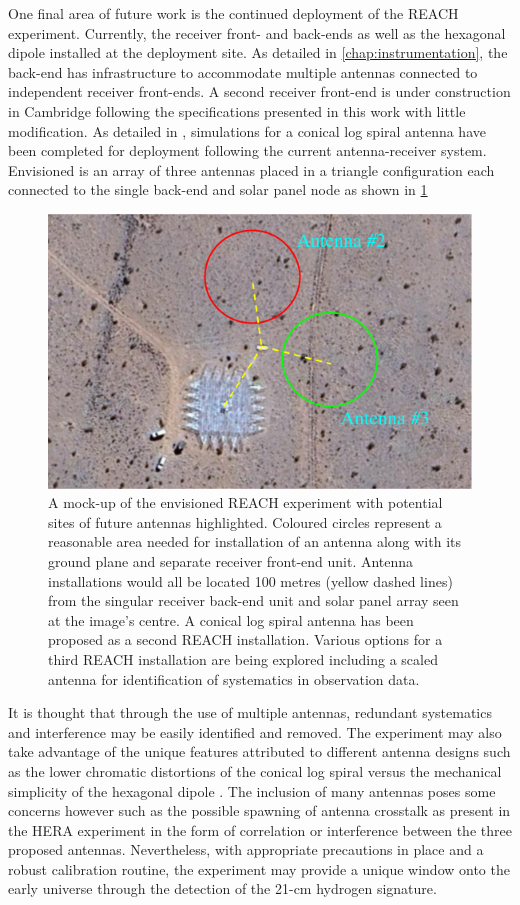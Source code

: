 One final area of future work is the continued deployment of the REACH experiment. Currently, the receiver front- and back-ends as well as the hexagonal dipole installed at the deployment site. As detailed in \cref{chap:instrumentation}, the back-end has infrastructure to accommodate multiple antennas connected to independent receiver front-ends. A second receiver front-end is under construction in Cambridge following the specifications presented in this work with little modification. As detailed in \citet{reach}, simulations for a conical log spiral antenna have been completed for deployment following the current antenna-receiver system. Envisioned is an array of three antennas placed in a triangle configuration each connected to the single back-end and solar panel node as shown in \cref{fig:reach_prime}
\begin{figure}
    \centering
    \includegraphics[width=.7\textwidth]{reach_prime}
    \caption{A mock-up of the envisioned REACH experiment with potential sites of future antennas highlighted. Coloured circles represent a reasonable area needed for installation of an antenna along with its ground plane and separate receiver front-end unit. Antenna installations would all be located 100 metres (yellow dashed lines) from the singular receiver back-end unit and solar panel array seen at the image's centre. A conical log spiral antenna has been proposed as a second REACH installation. Various options for a third REACH installation are being explored including a scaled antenna for identification of systematics in observation data.}
    \label{fig:reach_prime}
\end{figure}
It is thought that through the use of multiple antennas, redundant systematics and interference may be easily identified and removed. The experiment may also take advantage of the unique features attributed to different antenna designs such as the lower chromatic distortions of the conical log spiral versus the mechanical simplicity of the hexagonal dipole \citep{dom_antenna,john_antenna,reach}. The inclusion of many antennas poses some concerns however such as the possible spawning of antenna crosstalk as present in the HERA experiment \citep{hera_crosstalk} in the form of correlation or interference between the three proposed antennas. Nevertheless, with appropriate precautions in place and a robust calibration routine, the experiment may provide a unique window onto the early universe through the detection of the 21-cm hydrogen signature.

